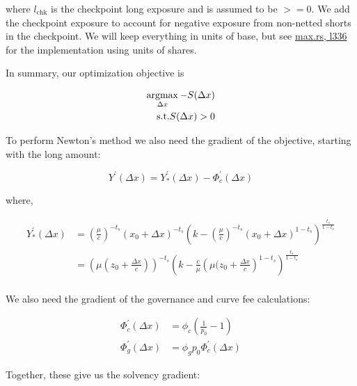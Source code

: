 where $l_{\text{chk}}$ is the checkpoint long exposure and is assumed to be $>= 0$.
We add the checkpoint exposure to account for negative exposure from non-netted shorts in the checkpoint.
We will keep everything in units of base, but see \href{https://github.com/delvtech/hyperdrive/blob/f410574fffcb8b2556208c158494ba2972525843/crates/hyperdrive-math/src/long/max.rs#L336}{max.rs, l336} for the implementation using units of shares.

In summary, our optimization objective is

\begin{equation}
\begin{split}
\argmax\limits_{\Delta x} -S(\Delta x) \\
\text{s.t.} S(\Delta x) > 0
\end{split}
\end{equation}


To perform Newton's method we also need the gradient of the objective, starting with the long amount:

\begin{equation}\label{long-amount-no-fees}
Y^{\prime}(\Delta x) = Y_{*}^{\prime}(\Delta x) - \Phi_{c}^{\prime}(\Delta x)
\end{equation}

where,

\begin{equation}
\begin{aligned}
Y_{*}^{\prime}(\Delta x) &= \left( \tfrac{\mu}{c} \right)^{-t_{s}} \left( x_{0} + \Delta x \right)^{-t_{s}} \left( k - \left( \tfrac{\mu}{c} \right)^{-t_{s}} \left( x_{0} + \Delta x \right)^{1-t_{s}}  \right)^{\tfrac{t_{s}}{1-t_{s}}} \\
&= \left( \mu (z_{0} + \tfrac{\Delta x}{c}) \right)^{-t_{s}} \left( k - \tfrac{c}{\mu} \left( \mu (z_{0} + \tfrac{\Delta x}{c} \right)^{1 - t_{s}} \right)^{\tfrac{t_{s}}{1 - t_{s}}} \\
\end{aligned}
\end{equation}

We also need the gradient of the governance and curve fee calculations:

\begin{align}
\Phi_{c}^{\prime}(\Delta x) &= \phi_{c}(\tfrac{1}{p_{0}} - 1) \\
\Phi_{g}^{\prime}(\Delta x) &= \phi_{g}p_{0}\Phi_{c}^{\prime}(\Delta x)
\end{align}

Together, these give us the solvency gradient:

